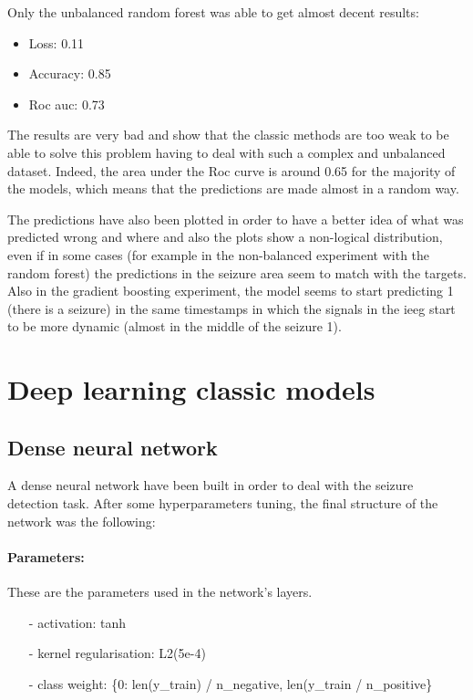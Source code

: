 Only the unbalanced random forest was able to get almost decent results:
\begin{itemize}
    \item Loss: 0.11
    \item Accuracy: 0.85
    \item Roc auc: 0.73
\end{itemize}

The results are very bad and show that the classic methods are too weak to be able to solve this problem having to deal with such a complex and unbalanced dataset. Indeed, the area under the Roc curve is around 0.65 for the majority of the models, which means that the predictions are made almost in a random way.

The predictions have also been plotted in order to have a better idea of what was predicted wrong and where and also the plots show a non-logical distribution, even if in some cases (for example in the non-balanced experiment with the random forest) the predictions in the seizure area seem to match with the targets. Also in the gradient boosting experiment, the model seems to start predicting 1 (there is a seizure) in the same timestamps in which the signals in the ieeg start to be more dynamic (almost in the middle of the seizure 1).


\section{Deep learning classic models}

\subsection{Dense neural network}

A dense neural network have been built in order to deal with the seizure detection task. After some hyperparameters tuning, the final structure of the network was the following:

\paragraph{Parameters:} These are the parameters used in the network's layers.
\begin{itemize}
    \item[-] activation: tanh
    \item[-] kernel regularisation: L2(5e-4)
    \item[-] class weight: \{0: len(y\_train) / n\_negative, len(y\_train / n\_positive\}
\end{itemize}

